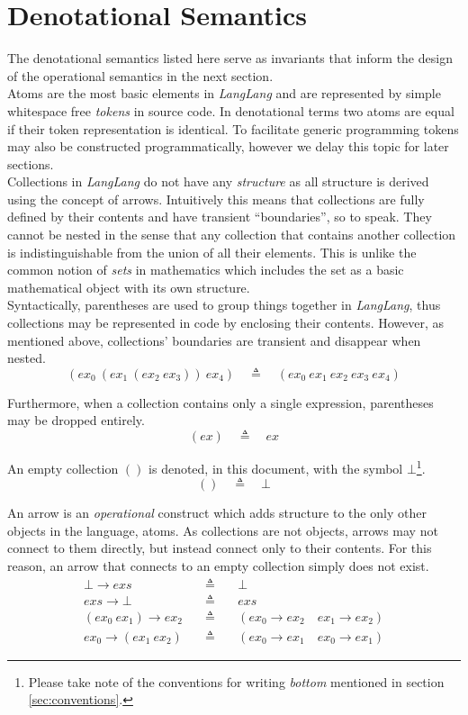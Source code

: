 \documentclass[a4paper,11pt]{article}
\begin{document}
\section{Denotational Semantics}

The denotational semantics listed here serve as invariants that inform the design of the operational semantics in the next section.\\

Atoms are the most basic elements in \textsl{LangLang} and are represented by simple whitespace free \emph{tokens} in source code.
In denotational terms two atoms are equal if their token representation is identical.
To facilitate generic programming tokens may also be constructed programmatically, however we delay this topic for later sections.\\

Collections in \textsl{LangLang} do not have any \emph{structure} as all structure is derived using the concept of arrows.
Intuitively this means that collections are fully defined by their contents and have transient ``boundaries'', so to speak.
They cannot be nested in the sense that any collection that contains another collection is indistinguishable from the union of all their elements.
This is unlike the common notion of \emph{sets} in mathematics which includes the set as a basic mathematical object with its own structure.\\

Syntactically, parentheses are used to group things together in \textsl{LangLang}, thus collections may be represented in code by enclosing their contents.
However, as mentioned above, collections' boundaries are transient and disappear when nested.
\[
(ex_0\ (ex_1\ (ex_2\ ex_3))\ ex_4) \quad\triangleq\quad (ex_0\ ex_1\ ex_2\ ex_3\ ex_4)
\]

Furthermore, when a collection contains only a single expression, parentheses may be dropped entirely.
\[
(ex) \quad\triangleq\quad ex
\]

An empty collection $()$ is denoted, in this document, with the symbol $\bot$\footnote{Please take note of the conventions for writing \emph{bottom} mentioned in section \ref{sec:conventions}.}.
\[
() \quad\triangleq\quad \bot
\]

An arrow is an \emph{operational} construct which adds structure to the only other objects in the language, atoms.
As collections are not objects, arrows may not connect to them directly, but instead connect only to their contents.
For this reason, an arrow that connects to an empty collection simply does not exist.
\begin{eqnarray*}
\bot \rightarrow exs \quad&\triangleq&\quad \bot \\
exs \rightarrow \bot \quad&\triangleq&\quad exs \\
(ex_0\ ex_1) \rightarrow ex_2 \quad&\triangleq&\quad (ex_0 \rightarrow ex_2 \quad ex_1 \rightarrow ex_2) \\
ex_0 \rightarrow (ex_1\ ex_2) \quad&\triangleq&\quad (ex_0 \rightarrow ex_1 \quad ex_0 \rightarrow ex_1)
\end{eqnarray*}
\end{document}
